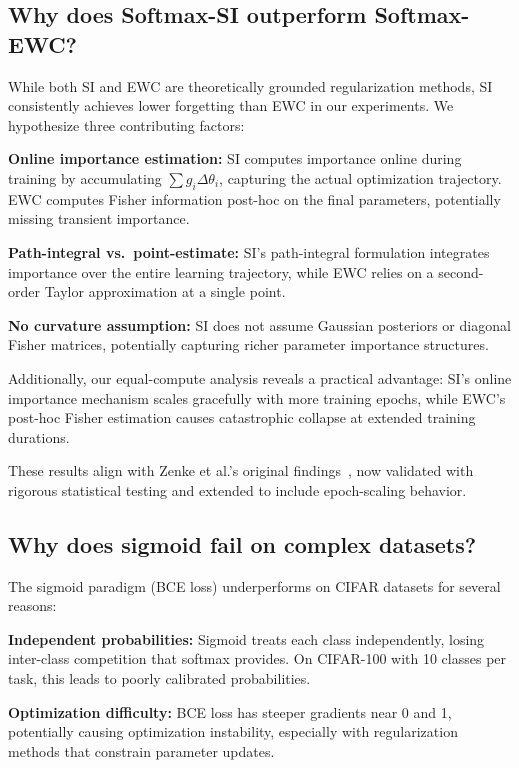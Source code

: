 \documentclass[preprint,review,12pt]{elsarticle}
\begin{document}
\subsection{Why does Softmax-SI outperform Softmax-EWC?}

While both SI and EWC are theoretically grounded regularization methods, SI consistently achieves lower forgetting than EWC in our experiments. We hypothesize three contributing factors:

\textbf{Online importance estimation:} SI computes importance online during training by accumulating $\sum g_i \Delta\theta_i$, capturing the actual optimization trajectory. EWC computes Fisher information post-hoc on the final parameters, potentially missing transient importance.

\textbf{Path-integral vs.\ point-estimate:} SI's path-integral formulation integrates importance over the entire learning trajectory, while EWC relies on a second-order Taylor approximation at a single point.

\textbf{No curvature assumption:} SI does not assume Gaussian posteriors or diagonal Fisher matrices, potentially capturing richer parameter importance structures.

Additionally, our equal-compute analysis reveals a practical advantage: SI's online importance mechanism scales gracefully with more training epochs, while EWC's post-hoc Fisher estimation causes catastrophic collapse at extended training durations.

These results align with Zenke et al.'s original findings~\cite{zenke2017continual}, now validated with rigorous statistical testing and extended to include epoch-scaling behavior.

\subsection{Why does sigmoid fail on complex datasets?}

The sigmoid paradigm (BCE loss) underperforms on CIFAR datasets for several reasons:

\textbf{Independent probabilities:} Sigmoid treats each class independently, losing inter-class competition that softmax provides. On CIFAR-100 with 10 classes per task, this leads to poorly calibrated probabilities.

\textbf{Optimization difficulty:} BCE loss has steeper gradients near 0 and 1, potentially causing optimization instability, especially with regularization methods that constrain parameter updates.
\end{document}

